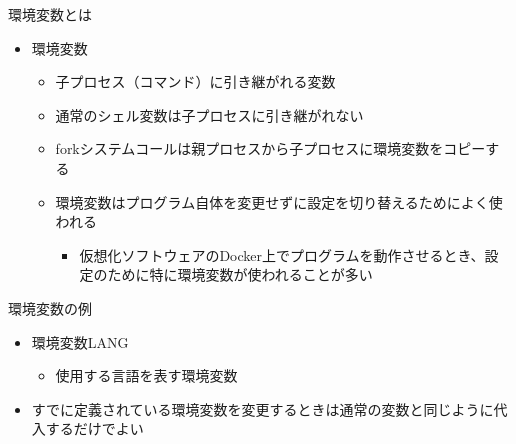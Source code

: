 \documentclass[12pt,aspectratio=169]{beamer}
\begin{document}
\begin{frame}{環境変数とは}
  \begin{itemize}
    \item 環境変数
      \begin{itemize}
        \item 子プロセス（コマンド）に引き継がれる変数
        \item 通常のシェル変数は子プロセスに引き継がれない
        \item forkシステムコールは親プロセスから子プロセスに環境変数をコピーする
        \item 環境変数はプログラム自体を変更せずに設定を切り替えるためによく使われる
          \begin{itemize}
            \item 仮想化ソフトウェアのDocker上でプログラムを動作させるとき、設定のために特に環境変数が使われることが多い
          \end{itemize}

      \end{itemize}

  \end{itemize}

\end{frame}

\begin{frame}{環境変数の例}
  \begin{itemize}
    \item 環境変数LANG
      \begin{itemize}
        \item 使用する言語を表す環境変数
      \end{itemize}

    \item すでに定義されている環境変数を変更するときは通常の変数と同じように代入するだけでよい
  \end{itemize}


\end{frame}
\end{document}
